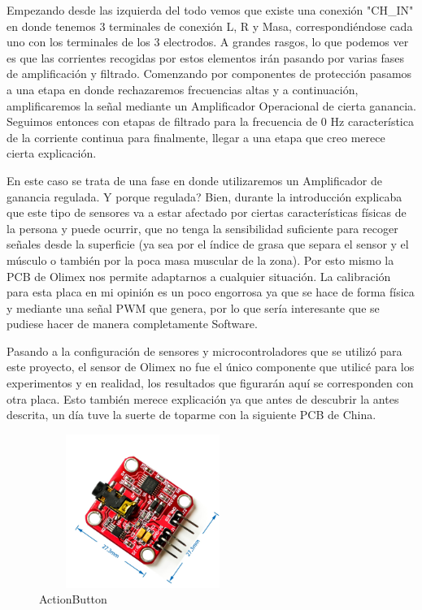 Empezando desde las izquierda del todo vemos que existe una conexión "CH\_IN" en donde tenemos 3 terminales de conexión L, R y Masa, correspondiéndose cada uno con los terminales de los 3 electrodos. A grandes rasgos, lo que podemos ver es que las corrientes recogidas por estos elementos irán pasando por varias fases de amplificación y filtrado. Comenzando por componentes de protección pasamos a una etapa en donde rechazaremos frecuencias altas y a continuación, amplificaremos la señal mediante un Amplificador Operacional de cierta ganancia. Seguimos entonces con etapas de filtrado para la frecuencia de 0 Hz característica de la corriente continua para finalmente, llegar a una etapa que creo merece cierta explicación.

En este caso se trata de una fase en donde utilizaremos un Amplificador de ganancia regulada. Y porque regulada? Bien, durante la introducción explicaba que este tipo de sensores va a estar afectado por ciertas características físicas de la persona y puede ocurrir, que no tenga la sensibilidad suficiente para recoger señales desde la superficie (ya sea por el índice de grasa que separa el sensor y el músculo o también por la poca masa muscular de la zona). Por esto mismo la PCB de Olimex nos permite adaptarnos a cualquier situación. La calibración para esta placa en mi opinión es un poco engorrosa ya que se hace de forma física y mediante una señal PWM que genera, por lo que sería interesante que se pudiese hacer de manera completamente Software.

Pasando a la configuración de sensores y microcontroladores que se utilizó para este proyecto, el sensor de Olimex no fue el único componente que utilicé para los experimentos y en realidad, los resultados que figurarán aquí se corresponden con otra placa. Esto también merece explicación ya que antes de descubrir la antes descrita, un día tuve la suerte de toparme con la siguiente PCB de China.

\begin{figure}[hp!]
\begin{center}
    \includegraphics[width=0.6\textwidth, height=5cm]{imaxes/placa_china.jpg}
    \caption{ActionButton}
    \label{fig:plot}
  \end{center}
\end{figure}

